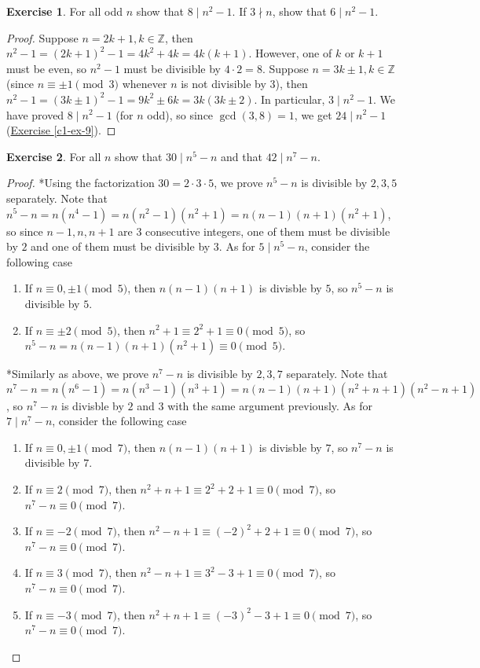 \documentclass{article}
\theoremstyle{definition}
\newtheorem{exercise}{Exercise}
\begin{document}
\newpage

\begin{exercise}
For all odd $n$ show that $8 \mid n^2 -1$. If $3 \nmid n$, show that $6 \mid n^2 -1$.
\end{exercise}
\begin{proof}
Suppose $n = 2k + 1, k \in \mathbb{Z}$, then $n^2 - 1 = (2k + 1)^2 - 1 = 4k^2 + 4k = 4 k(k + 1)$. However, one of $k$ or $k + 1$ must be even, so $n^2 - 1$ must be divisible by $4 \cdot 2 = 8$. Suppose $n = 3k \pm 1, k \in \mathbb{Z}$ (since $n \equiv \pm 1 \pmod{3}$ whenever $n$ is not divisible by $3$), then $n^2 - 1 = (3k \pm 1)^2 - 1 = 9k^2 \pm 6k = 3k (3k \pm 2)$. In particular, $3 \mid n^2 - 1$. We have proved $8 \mid n^2 - 1$ (for $n$ odd), so since $\gcd(3, 8) = 1$, we get $24 \mid n^2 - 1$ (\hyperref[c1-ex-9]{Exercise \ref*{c1-ex-9}}).
\end{proof}

\newpage

\begin{exercise}
For all $n$ show that $30 \mid n^5 - n$ and that $42 \mid n^7 - n$.
\end{exercise}
\begin{proof}
*Using the factorization $30 = 2 \cdot 3 \cdot 5$, we prove $n^5 - n$ is divisible by $2, 3, 5$ separately. Note that $n^5 - n = n (n^4 - 1) = n(n^2 - 1)(n^2 + 1) = n (n - 1) (n + 1) (n^2 + 1)$, so since $n - 1, n, n + 1$ are $3$ consecutive integers, one of them must be divisible by $2$ and one of them must be divisible by $3$. As for $5 \mid n^5 - n$, consider the following case
\begin{enumerate}
	\item If $n \equiv 0, \pm 1 \pmod{5}$, then $n (n - 1) (n + 1)$ is divisble by $5$, so $n^5 - n$ is divisible by $5$.
	\item If $n \equiv \pm 2 \pmod{5}$, then $n^2 + 1 \equiv 2^2 + 1 \equiv 0 \pmod{5}$, so $n^5 - n = n(n - 1)(n + 1)(n^2 + 1) \equiv 0 \pmod{5}$.
\end{enumerate}
*Similarly as above, we prove $n^7 - n$ is divisible by $2, 3, 7$ separately. Note that $n^7 - n = n(n^6 - 1) = n(n^3 - 1)(n^3 + 1) = n(n - 1)(n + 1)(n^2 + n + 1)(n^2 - n + 1)$, so $n^7 - n$ is divisble by $2$ and $3$ with the same argument previously. As for $7 \mid n^7 - n$, consider the following case
\begin{enumerate}
	\item If $n \equiv 0, \pm 1 \pmod{7}$, then $n (n - 1) (n + 1)$ is divisble by $7$, so $n^7 - n$ is divisible by $7$.
	\item If $n \equiv 2 \pmod{7}$, then $n^2 + n + 1 \equiv 2^2 + 2 + 1 \equiv 0 \pmod{7}$, so $n^7 - n \equiv 0 \pmod{7}$.
	\item If $n \equiv -2 \pmod{7}$, then $n^2 - n + 1 \equiv (-2)^2 + 2 + 1 \equiv 0 \pmod{7}$, so $n^7 - n \equiv 0 \pmod{7}$.
	\item If $n \equiv 3 \pmod{7}$, then $n^2 - n + 1 \equiv 3^2 - 3 + 1 \equiv 0 \pmod{7}$, so $n^7 - n \equiv 0 \pmod{7}$.
	\item If $n \equiv -3 \pmod{7}$, then $n^2 + n + 1 \equiv (-3)^2 - 3 + 1 \equiv 0 \pmod{7}$, so $n^7 - n \equiv 0 \pmod{7}$.
\end{enumerate}
\end{proof}
\end{document}
